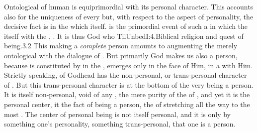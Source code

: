 Ontological  of human  is equiprimordial with its
personal character.  This  accounts also for the uniqueness of
every  but, with respect to the aspect of personality, the
decisive fact is  in the  which  itself.
 is the primordial event of such a  in which the
 itself with the , . It is
thus God who \citet{makes of us a complete person and, consequently, in a
  meeting with us is fully personal.}{TilUnbed}{I:4.Biblical religion and quest
  of being.3.2} This making a {\em complete} person amounts to augmenting the
merely ontological  with the dialogue of .  But primarily God makes us also a person, because 
is constituted by  in the , emerges only in the
face of Him, in a  with Him.  Strictly speaking,
 of Godhead has the non-personal, or trans-personal character of
. But this trans-personal character is at the bottom of the very being
a person.  It is itself non-personal, void of any , the mere purity
of the  of , and yet it is the personal center, it
 the fact of being a person, the  of 
stretching all the way to the most . The center of
personal being is not itself personal, and it is only by 
something  one's personality, something trans-personal, that
one is a person.

